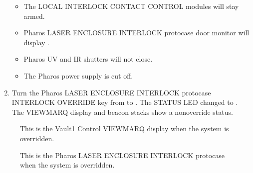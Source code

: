 \documentclass[letterpaper,10pt,english]{sphinxmanual}
\begin{document}
\begin{enumerate}
\begin{itemize}
\item {} 
\sphinxAtStartPar
The LOCAL INTERLOCK CONTACT CONTROL modules will stay armed.

\item {} 
\sphinxAtStartPar
Pharos LASER ENCLOSURE INTERLOCK protocase door monitor will display .

\item {} 
\sphinxAtStartPar
Pharos UV and IR shutters will not close.

\item {} 
\sphinxAtStartPar
The Pharos power supply is cut off.

\end{itemize}

\item {} 
\sphinxAtStartPar
Turn the Pharos LASER ENCLOSURE INTERLOCK protocase INTERLOCK OVERRIDE key from  to .
The STATUS LED changed to .
The VIEWMARQ display and beacon stacks show a non\sphinxhyphen{}override status.

\end{enumerate}

\begin{figure}[htbp]
\centering
\capstart

\noindent{}
\caption{ This is the Vault\sphinxhyphen{}1 Control VIEWMARQ display when the system is overridden.}\label{\detokenize{testing_documentation/Vault-1_laser:id12}}\end{figure}

\begin{figure}[htbp]
\centering
\capstart

\noindent{}
\caption{ This is the Pharos LASER ENCLOSURE INTERLOCK protocase when the system is overridden.}\label{\detokenize{testing_documentation/Vault-1_laser:id13}}\end{figure}
\end{document}

